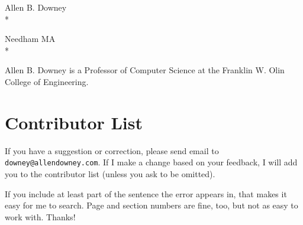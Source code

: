 \documentclass[12pt]{book}
\begin{document}
Allen B. Downey \\*

Needham MA \\*

Allen B. Downey is a Professor of Computer Science at 
the Franklin W. Olin College of Engineering.



\section*{Contributor List}

If you have a suggestion or correction, please send email to 
{\tt downey@allendowney.com}.  If I make a change based on your
feedback, I will add you to the contributor list
(unless you ask to be omitted).

If you include at least part of the sentence the
error appears in, that makes it easy for me to search.  Page and
section numbers are fine, too, but not as easy to work with.
Thanks!

\small
\end{document}
